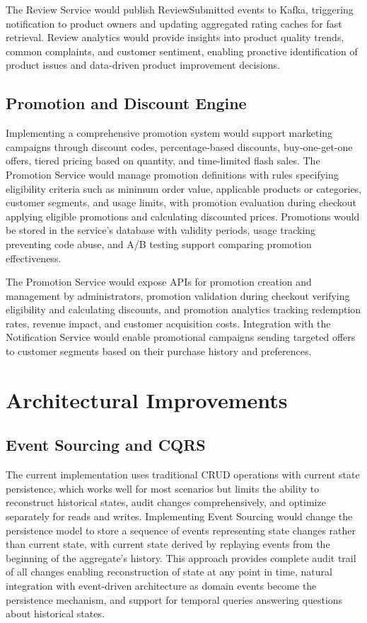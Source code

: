 The Review Service would publish ReviewSubmitted events to Kafka, triggering notification to product owners and updating aggregated rating caches for fast retrieval. Review analytics would provide insights into product quality trends, common complaints, and customer sentiment, enabling proactive identification of product issues and data-driven product improvement decisions.

\subsection{Promotion and Discount Engine}

Implementing a comprehensive promotion system would support marketing campaigns through discount codes, percentage-based discounts, buy-one-get-one offers, tiered pricing based on quantity, and time-limited flash sales. The Promotion Service would manage promotion definitions with rules specifying eligibility criteria such as minimum order value, applicable products or categories, customer segments, and usage limits, with promotion evaluation during checkout applying eligible promotions and calculating discounted prices. Promotions would be stored in the service's database with validity periods, usage tracking preventing code abuse, and A/B testing support comparing promotion effectiveness.

The Promotion Service would expose APIs for promotion creation and management by administrators, promotion validation during checkout verifying eligibility and calculating discounts, and promotion analytics tracking redemption rates, revenue impact, and customer acquisition costs. Integration with the Notification Service would enable promotional campaigns sending targeted offers to customer segments based on their purchase history and preferences.

\section{Architectural Improvements}

\subsection{Event Sourcing and CQRS}

The current implementation uses traditional CRUD operations with current state persistence, which works well for most scenarios but limits the ability to reconstruct historical states, audit changes comprehensively, and optimize separately for reads and writes. Implementing Event Sourcing would change the persistence model to store a sequence of events representing state changes rather than current state, with current state derived by replaying events from the beginning of the aggregate's history. This approach provides complete audit trail of all changes enabling reconstruction of state at any point in time, natural integration with event-driven architecture as domain events become the persistence mechanism, and support for temporal queries answering questions about historical states.

